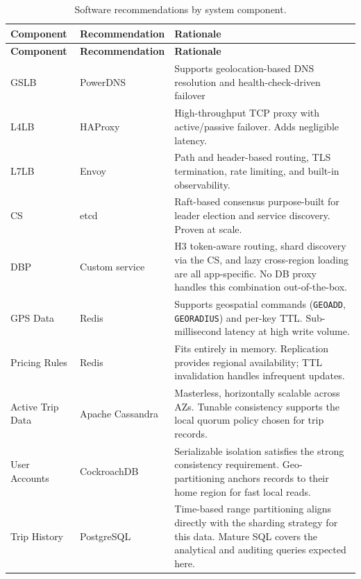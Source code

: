 \documentclass[12pt]{article}
\begin{document}
\small
\begin{longtable}{@{}>{\raggedright\arraybackslash}p{3.3cm}>{\raggedright\arraybackslash}p{3.6cm}>{\raggedright\arraybackslash}p{8.8cm}@{}}
    \caption{Software recommendations by system component.}
    \label{tab:tech-recommendations}\\
    \toprule
    \textbf{Component} & \textbf{Recommendation} & \textbf{Rationale}\\
    \midrule
    \endfirsthead
    \toprule
    \textbf{Component} & \textbf{Recommendation} & \textbf{Rationale}\\
    \midrule
    \endhead
    \bottomrule
    \endlastfoot
    GSLB
        & PowerDNS \cite{powerdns}
        & Supports geolocation-based DNS resolution and health-check-driven failover \\
    \addlinespace
    L4LB
        & HAProxy \cite{haproxy}
        & High-throughput TCP proxy with active/passive failover. Adds negligible latency. \\
    \addlinespace
    L7LB
        & Envoy \cite{envoy}
        & Path and header-based routing, TLS termination, rate limiting, and built-in observability. \\
    \addlinespace
    CS
        & etcd \cite{etcd}
        & Raft-based consensus purpose-built for leader election and service discovery. Proven at scale. \\
    \addlinespace
    DBP
        & Custom service
        & H3 token-aware routing, shard discovery via the CS, and lazy cross-region loading are all app-specific. No DB proxy handles this combination out-of-the-box. \\
    \addlinespace
    GPS Data
        & Redis \cite{redis}
        & Supports geospatial commands (\texttt{GEOADD}, \texttt{GEORADIUS}) and per-key TTL. Sub-millisecond latency at high write volume. \\
    \addlinespace
    Pricing Rules
        & Redis
        & Fits entirely in memory. Replication provides regional availability; TTL invalidation handles infrequent updates. \\
    \addlinespace
    Active Trip Data
        & Apache Cassandra \cite{apachecassandra}
        & Masterless, horizontally scalable across AZs. Tunable consistency supports the local quorum policy chosen for trip records. \\
    \addlinespace
    User Accounts
        & CockroachDB \cite{cockroachdb}
        & Serializable isolation satisfies the strong consistency requirement. Geo-partitioning anchors records to their home region for fast local reads. \\
    \addlinespace
    Trip History
        & PostgreSQL \cite{postgresql}
        & Time-based range partitioning aligns directly with the sharding strategy for this data. Mature SQL covers the analytical and auditing queries expected here. \\
\end{longtable}
\normalsize



\end{document}
